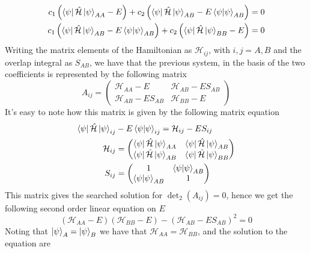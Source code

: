 \documentclass[../qm.tex]{subfiles}
\begin{document}
	\begin{equation}
		\begin{aligned}
			c_1\left( \bra{\psi}\hat{\mathcal{H}}\ket{\psi}_{AA}-E \right)+c_2\left( \bra{\psi}\hat{\mathcal{H}}\ket{\psi}_{AB}-E\braket{\psi}_{AB} \right)&=0\\
			c_1\left( \bra{\psi}\hat{\mathcal{H}}\ket{\psi}_{AB}-E\braket{\psi}_{AB} \right)+c_2\left( \bra{\psi}\hat{\mathcal{H}}\ket{\psi}_{BB}-E \right)&=0
		\end{aligned}
		\label{eq:finalconditionmatrix}
	\end{equation}
	Writing the matrix elements of the Hamiltonian as $\mathcal{H}_{ij}$, with $i,j=A,B$ and the overlap integral as $S_{AB}$, we have that the previous system, in the basis of the two coefficients is represented by the following matrix
	\begin{equation*}
		A_{ij}=\begin{pmatrix}
			\mathcal{H}_{AA}-E&\mathcal{H}_{AB}-ES_{AB}\\
			\mathcal{H}_{AB}-ES_{AB}&\mathcal{H}_{BB}-E
		\end{pmatrix}
	\end{equation*}
	It's easy to note how this matrix is given by the following matrix equation
	\begin{equation*}
		\begin{aligned}
			\bra{\psi}\hat{\mathcal{H}}\ket{\psi}_{ij}&-E\braket{\psi}_{ij}=\mathcal{H}_{ij}-ES_{ij}\\
			\mathcal{H}_{ij}&=\begin{pmatrix}
				\bra{\psi}\hat{\mathcal{H}}\ket{\psi}_{AA}&\bra{\psi}\hat{\mathcal{H}}\ket{\psi}_{AB}\\
				\bra{\psi}\hat{\mathcal{H}}\ket{\psi}_{AB}&\bra{\psi}\hat{\mathcal{H}}\ket{\psi}_{BB}
			\end{pmatrix}\\
			S_{ij}&=\begin{pmatrix}
				1&\braket{\psi}_{AB}\\
				\braket{\psi}_{AB}&1
			\end{pmatrix}
		\end{aligned}
	\end{equation*}
	This matrix gives the searched solution for $\det_2(A_{ij})=0$, hence we get the following second order linear equation on $E$
	\begin{equation*}
		\left( \mathcal{H}_{AA}-E \right)\left( \mathcal{H}_{BB}-E \right)-\left( \mathcal{H}_{AB}-ES_{AB} \right)^2=0
	\end{equation*}
	Noting that $\ket{\psi}_A=\ket{\psi}_B$ we have that $\mathcal{H}_{AA}=\mathcal{H}_{BB}$, and the solution to the equation are
\end{document}
